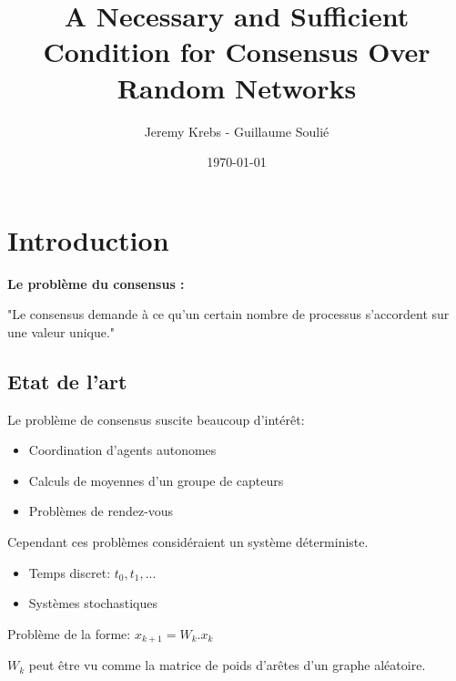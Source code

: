 \documentclass{beamer}
\title{A Necessary and Sufficient Condition for
Consensus Over Random Networks}
\author{Jeremy Krebs - Guillaume Soulié}
\institute{Université Paris Saclay}
\date{\today}
\begin{document}
\begin{frame}
\titlepage
\end{frame}


\section{Introduction}
\begin{frame}
	\textbf{Le problème du consensus :}

	"Le consensus demande à ce qu'un certain nombre de processus s'accordent sur une valeur unique."
	\begin{center}
	\end{center}
\end{frame}


\begin{frame}
	\tableofcontents
\end{frame}

\subsection{Etat de l'art}
\begin{frame}
		Le problème de consensus suscite beaucoup d'intérêt:
		 \begin{itemize}
		 	\item Coordination d'agents autonomes
		 	\item Calculs de moyennes d'un groupe de capteurs
		 	\item Problèmes de rendez-vous
		 \end{itemize}
		 
		 Cependant ces problèmes considéraient un système déterministe.
\end{frame}		

\begin{frame}
	\begin{itemize}
		\item Temps discret: $t_0, t_1, ...$
		\item Systèmes stochastiques
	\end{itemize}
	
	\pause
	
	Problème de la forme:
	$ x_{k+1} = W_k . x_k $
	
	$W_k$ peut être vu comme la matrice de poids d'arêtes d'un graphe aléatoire.
\end{frame}
\end{document}

